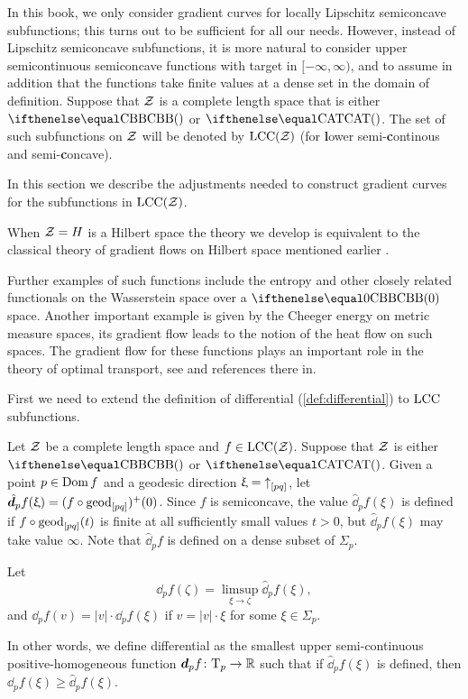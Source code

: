 In this book, we only consider gradient curves for locally Lipschitz semiconcave subfunctions;
this turns out to be sufficient for all our needs.
However, 
instead of Lipschitz semiconcave subfunctions,
it is more natural to consider upper semicontinuous semiconcave functions
with target in $[-\infty,\infty)$,
and to assume in addition that 
the functions take finite values at a dense set in the domain of definition.
Suppose that $\mathcal{Z}$ is a complete length space that is either $\Alex{}$ or $\CAT{}$.
The set of such subfunctions on $\mathcal{Z}$ will be denoted by 
$\mathrm{LCC}(\mathcal{Z})$ (for \textbf{l}ower semi-\textbf{c}ontinous and semi-\textbf{c}oncave).

In this section we describe the adjustments needed
to construct gradient curves for the subfunctions in $\mathrm{LCC}(\mathcal{Z})$.

When $\mathcal{Z}=H$ is a Hilbert space the theory we develop is equivalent to the classical theory of gradient flows on Hilbert space mentioned earlier \cite{Brezis-book}.

Further examples of such functions include the entropy and other closely related functionals on the Wasserstein space over a $\Alex0$ space.
Another important example is given by the Cheeger energy on metric measure spaces, its gradient flow leads to the notion of the heat flow on such spaces.
The gradient flow for these functions plays an important role in the theory of optimal transport, see \cite{villani} and references there in. 


First we need to extend the definition of differential (\ref{def:differential}) to $\mathrm{LCC}$ subfunctions.

Let $\mathcal{Z}$ be a complete length space and $f\in\LSCSC(\spc{Z})$.
Suppose that $\mathcal{Z}$ is either $\Alex{}$ or $\CAT{}$.
Given a point $p\in \Dom f$ and a geodesic direction $\upxi={\uparrow}_{[{p}{q}]}$, 
let 
$\hat \dd_pf(\xi)=(f\circ\geod_{[pq]})^+(0)$.
Since $f$ is semiconcave, the value $\hat \dd_pf(\xi)$ is defined if $f\circ\geod_{[pq]}(t)$ is finite at all sufficiently small values $t>0$,
but $\hat \dd_pf(\xi)$ may take value $\infty$. 
Note that $\hat \dd_pf$ is defined on a dense subset of $\Sigma_p$.

Let 
\[\dd_pf(\zeta)=\limsup_{\xi\to\zeta}\hat\dd_pf(\xi),\]
and $\dd_pf(v)=|v|\cdot \dd_pf(\xi)$ if $v=|v|\cdot\xi$ for some $\xi\in\Sigma_p$.

In other words, we define differential as the smallest 
upper semi-continuous  positive-homogeneous function $\dd_pf\:\T_p\to\RR$
such that if $\hat\dd_pf(\xi)$ is defined, then $\dd_pf(\xi)\ge \hat \dd_pf(\xi)$.



